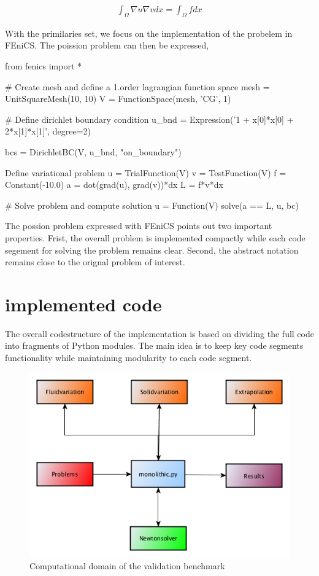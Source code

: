 \begin{align*}
\int_{\Omega} \nabla u \nabla v dx = \int_{\Omega} f dx
\end{align*}

With the primilaries set, we focus on the implementation of the probelem in FEniCS. The poission problem can then be expressed,

\begin{python}[caption=posssion.py]
from fenics import *

# Create mesh and define a 1.order lagrangian function space
mesh = UnitSquareMesh(10, 10)
V = FunctionSpace(mesh, 'CG', 1)

# Define dirichlet boundary condition
u_bnd = Expression('1 + x[0]*x[0] + 2*x[1]*x[1]', degree=2)

bcs = DirichletBC(V, u_bnd, "on_boundary")

Define variational problem
u = TrialFunction(V)
v = TestFunction(V)
f = Constant(-10.0)
a = dot(grad(u), grad(v))*dx
L = f*v*dx

# Solve problem and compute solution
u = Function(V)
solve(a == L, u, bc)
\end{python}

The possion problem expressed with FEniCS points out two important properties. Frist, the overall problem is implemented compactly while each code segement for solving the problem remains clear.  Second, the abstract notation remains close to the orignal problem of interest. 

\section{implemented code}

The overall codestructure of the implementation is based on dividing the full code into fragments of Python modules. The main idea is to keep key code segments functionality while maintaining modularity to each code segment.

\begin{figure}[h!]
\hspace*{-2.2cm}
\centering    
 \includegraphics[scale=0.6]{./Fig/mapofsolver.png}
 \caption{Computational domain of the validation benchmark}
\end{figure}



 




  
